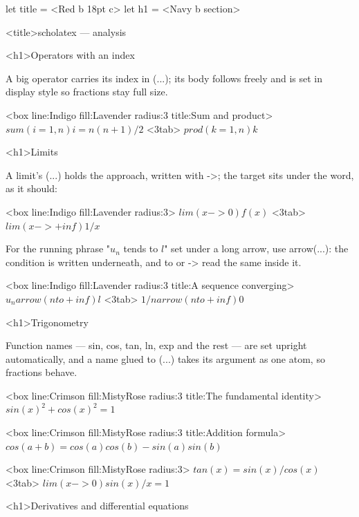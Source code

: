 \documentclass[
  margins=8,
  font=Latin Modern Roman,
  size=12,
  linespread=1.4,
  lang=en
]{scholatex}
\begin{document}
let title = <Red b 18pt c>
let h1    = <Navy b section>

<title>scholatex — analysis

<h1>Operators with an index

A big operator carries its index in (...); its body follows freely
and is set in display style so fractions stay full size.

<box line:Indigo fill:Lavender radius:3 title:{Sum and product}>{
	$sum(i=1, n) i = n(n+1)/2$ <3tab> $prod(k=1, n) k$
}

<h1>Limits

A limit's (...) holds the approach, written with ->; the target
sits under the word, as it should:

<box line:Indigo fill:Lavender radius:3>{
	$lim(x->0) f(x)$ <3tab> $lim(x->+inf) 1/x$
}

For the running phrase "$u_n$ tends to $l$" set under a long arrow, use
arrow(...): the condition is written underneath, and to or ->
read the same inside it.

<box line:Indigo fill:Lavender radius:3 title:{A sequence converging}>{
	$u_n arrow(n to +inf) l$ <3tab> $1/n arrow(n to +inf) 0$
}

<h1>Trigonometry

Function names — sin, cos, tan, ln, exp and
the rest — are set upright automatically, and a name glued to (...)
takes its argument as one atom, so fractions behave.

<box line:Crimson fill:MistyRose radius:3 title:{The fundamental identity}>{
	$sin(x)^2 + cos(x)^2 = 1$
}

<box line:Crimson fill:MistyRose radius:3 title:{Addition formula}>{
	$cos(a+b) = cos(a)cos(b) - sin(a)sin(b)$
}

<box line:Crimson fill:MistyRose radius:3>{
	$tan(x) = sin(x)/cos(x)$ <3tab> $lim(x->0) sin(x)/x = 1$
}

<h1>Derivatives and differential equations
\end{document}
